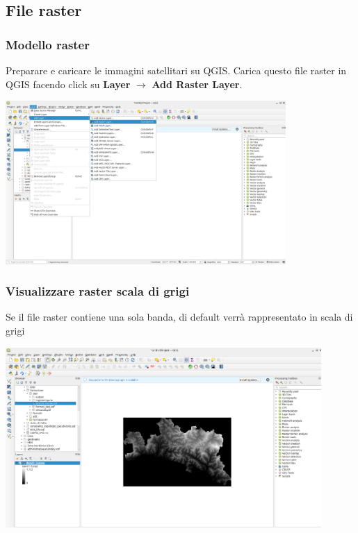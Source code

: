 \documentclass{beamer}
\begin{document}
{\subsection{File raster}
\begin{frame}
  \frametitle{Modello raster }
   Preparare e caricare le immagini satellitari su QGIS. Carica questo file raster in QGIS facendo click su \textbf{Layer} $\rightarrow$ \textbf{Add Raster Layer}.
		    \begin{center}
			\includegraphics[width=0.80\textwidth] {digitizing_pics/add_raster.png}
		    \end{center}
\end{frame} 


\begin{frame}
  \frametitle{Visualizzare raster scala di grigi}
    Se il file raster contiene una sola banda, di default verrà rappresentato in scala di grigi
		    \begin{center}
			\includegraphics[width=0.90\textwidth] {digitizing_pics/grey.png}
		    \end{center}
\end{frame} 


}
\end{document}

